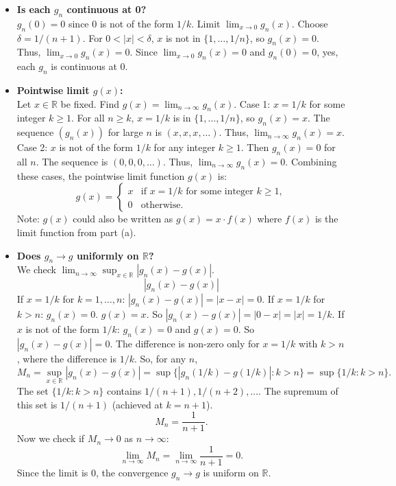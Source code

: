 \documentclass{article}
\newcommand{\R}{\mathbb{R}}
\begin{document}
\begin{enumerate}
    \begin{itemize}
        \item \textbf{Is each \(g_n\) continuous at 0?}\\
            \(g_n(0) = 0\) since 0 is not of the form \(1/k\).
            Limit \(\lim_{x\to 0} g_n(x)\). Choose \(\delta = 1/(n+1)\). For \(0 < |x| < \delta\), \(x\) is not in \(\{1, \dots, 1/n\}\), so \(g_n(x) = 0\).
            Thus, \(\lim_{x\to 0} g_n(x) = 0\).
            Since \(\lim_{x\to 0} g_n(x) = 0\) and \(g_n(0) = 0\), yes, each \(g_n\) is continuous at 0.

        \item \textbf{Pointwise limit \(g(x)\):} \\
            Let \(x \in \R\) be fixed. Find \(g(x) = \lim_{n\to\infty} g_n(x)\).
            Case 1: \(x = 1/k\) for some integer \(k \ge 1\).
            For all \(n \ge k\), \(x = 1/k\) is in \(\{1, \dots, 1/n\}\), so \(g_n(x) = x\). The sequence \((g_n(x))\) for large \(n\) is \((x, x, x, \ldots)\). Thus, \(\lim_{n\to\infty} g_n(x) = x\).
            Case 2: \(x\) is not of the form \(1/k\) for any integer \(k \ge 1\).
            Then \(g_n(x) = 0\) for all \(n\). The sequence is \((0, 0, 0, \ldots)\). Thus, \(\lim_{n\to\infty} g_n(x) = 0\).
            Combining these cases, the pointwise limit function \(g(x)\) is:
            \[ g(x) = \begin{cases} x & \text{if } x=1/k \text{ for some integer } k \ge 1, \\ 0 & \text{otherwise.} \end{cases} \]
            Note: \(g(x)\) could also be written as \(g(x) = x \cdot f(x)\) where \(f(x)\) is the limit function from part (a).

        \item \textbf{Does \(g_n \to g\) uniformly on \(\R\)?} \\
            We check \(\lim_{n\to\infty} \sup_{x \in \R} |g_n(x) - g(x)|\).
            \[ |g_n(x) - g(x)| \]
            If \(x = 1/k\) for \(k = 1, \ldots, n\): \(|g_n(x) - g(x)| = |x - x| = 0\).
            If \(x = 1/k\) for \(k > n\): \(g_n(x) = 0\). \(g(x) = x\). So \(|g_n(x) - g(x)| = |0 - x| = |x| = 1/k\).
            If \(x\) is not of the form \(1/k\): \(g_n(x) = 0\) and \(g(x) = 0\). So \(|g_n(x) - g(x)| = 0\).
            The difference is non-zero only for \(x = 1/k\) with \(k > n\), where the difference is \(1/k\).
            So, for any \(n\),
            \[ M_n = \sup_{x \in \R} |g_n(x) - g(x)| = \sup \{ |g_n(1/k) - g(1/k)| : k > n \} = \sup \{ 1/k : k > n \}. \]
            The set \(\{1/k : k > n\}\) contains \(1/(n+1), 1/(n+2), \ldots\). The supremum of this set is \(1/(n+1)\) (achieved at \(k=n+1\)).
            \[ M_n = \frac{1}{n+1}. \]
            Now we check if \(M_n \to 0\) as \(n \to \infty\):
            \[ \lim_{n\to\infty} M_n = \lim_{n\to\infty} \frac{1}{n+1} = 0. \]
            Since the limit is 0, the convergence \(g_n \to g\) is uniform on \(\R\).


\end{itemize}
\end{enumerate}
\end{document}
